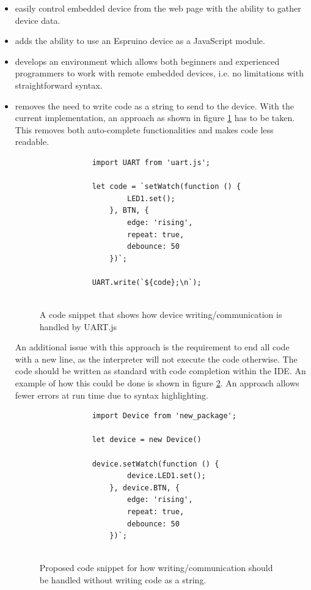 \documentclass{l4proj}
\begin{document}
\begin{itemize}
    \item easily control embedded device from the web page with the ability to gather device data.
    \item adds the ability to use an Espruino device as a JavaScript module.
    \item develops an environment which allows both beginners and experienced programmers to work with remote embedded devices, i.e. no limitations with straightforward syntax.
    \item removes the need to write code as a string to send to the device. With the current implementation, an approach as shown in figure \ref{fig:OLD_UART_DEVICE_WRITING_CODE} has to be taken. This removes both auto-complete functionalities and makes code less readable.

    \begin{figure}[!ht]
        \begin{lstlisting}
            import UART from 'uart.js';
        
            let code = `setWatch(function () {
                    LED1.set();
                }, BTN, {
                    edge: 'rising',
                    repeat: true,
                    debounce: 50
                })`;

            UART.write(`${code};\n`);
            
        \end{lstlisting}
        \caption{A code snippet that shows how device writing/communication is handled by UART.js}
        \label{fig:OLD_UART_DEVICE_WRITING_CODE}
    \end{figure}

     An additional issue with this approach is the requirement to end all code with a new line, as the interpreter will not execute the code otherwise. The code should be written as standard with code completion within the IDE. An example of how this could be done is shown in figure \ref{fig:NEW_DEVICE_WRITING_CODE}. An approach allows fewer errors at run time due to syntax highlighting. 

     \begin{figure}[!ht]
        \begin{lstlisting}
            import Device from 'new_package';

            let device = new Device()
        
            device.setWatch(function () {
                    device.LED1.set();
                }, device.BTN, {
                    edge: 'rising',
                    repeat: true,
                    debounce: 50
                })`;
            
        \end{lstlisting}
        \caption{Proposed code snippet for how writing/communication should be handled without writing code as a string.}
        \label{fig:NEW_DEVICE_WRITING_CODE}
    \end{figure}
\end{itemize}
\end{document}
